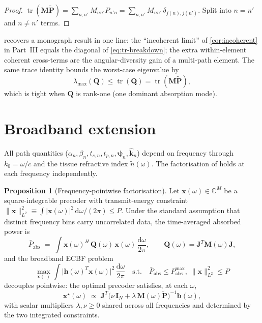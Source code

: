 \documentclass[11pt,a4paper]{article}
\theoremstyle{definition}
\newtheorem{proposition}[proposition]{Proposition}
\newcommand{\khat}{\hat{\bm{k}}}
\newcommand{\diff}{\mathrm{d}}
\newcommand{\Complex}{\mathbb{C}}
\newcommand{\Jmat}{\mathbf{J}}                 %
\newcommand{\Mmat}{\mathbf{M}}                 %
\newcommand{\Qmat}{\mathbf{Q}}                 %
\newcommand{\Pmat}{\tilde{\mathbf{P}}}         %
\newcommand{\xx}{\mathbf{x}}
\newcommand{\hh}{\mathbf{h}}
\newcommand{\bvec}{\mathbf{b}}
\newcommand{\psin}{\bm{\psi}_n}
\newcommand{\Id}{\mathbf{I}}
\begin{document}
\begin{proof}
$\operatorname{tr}(\Mmat\Pmat)=\sum_{n,n'}M_{nn'}P_{n'n}
=\sum_{n,n'}M_{nn'}\,\delta_{j(n),j(n')}$.  Split into $n=n'$ and $n\ne n'$
terms.
\end{proof}

 recovers a monograph result in one line: the
``incoherent limit'' of \cref{cor:incoherent} in Part~III equals the
diagonal of \eqref{eq:tr-breakdown}; the extra within-element coherent
cross-terms are the angular-diversity gain of a multi-path element.  The
same trace identity bounds the worst-case eigenvalue by
\begin{equation}\label{eq:lam-tr-bound}
  \lambda_{\max}(\Qmat)\le\operatorname{tr}(\Qmat)=\operatorname{tr}(\Mmat\Pmat),
\end{equation}
which is tight when $\Qmat$ is rank-one (one dominant absorption mode).

\section{Broadband extension}\label{sec:broadband}

All path quantities ($\alpha_n,\beta_n,t_{s,n},t_{p,n},\psin,\khat_n$) depend
on frequency through $k_0=\omega/c$ and the tissue refractive index
$\tilde{n}(\omega)$.  The factorisation of
 holds at each frequency independently.

\begin{proposition}[Frequency-pointwise factorisation]\label{prop:omega-pt}
Let $\xx(\omega)\in\Complex^M$ be a square-integrable precoder with
transmit-energy constraint
$\|\xx\|_{L^2}^2\equiv\int|\xx(\omega)|^2\,\diff\omega/(2\pi)\le P$.  Under
the standard assumption that distinct frequency bins carry uncorrelated
data, the time-averaged absorbed power is
\begin{equation}\label{eq:Pabs-omega}
  \bar{P}_\mathrm{abs}
  \;=\;\int \xx(\omega)^H\,\Qmat(\omega)\,\xx(\omega)\,\frac{\diff\omega}{2\pi},
  \qquad
  \Qmat(\omega)=\Jmat^T\Mmat(\omega)\Jmat,
\end{equation}
and the broadband ECBF problem
\begin{equation}\label{eq:ecbf-omega}
  \max_{\xx(\cdot)}\int\bigl|\hh(\omega)^T\xx(\omega)\bigr|^2\,\frac{\diff\omega}{2\pi}
  \quad\text{s.t.}\quad
  \bar{P}_\mathrm{abs}\le P_\mathrm{abs}^{\max},\;\|\xx\|_{L^2}^2\le P
\end{equation}
decouples pointwise: the optimal precoder satisfies, at each $\omega$,
\begin{equation}\label{eq:x-omega}
  \xx^\star(\omega)\;\propto\;\Jmat^T\bigl(\nu\,\Id_N
  +\lambda\,\Mmat(\omega)\Pmat\bigr)^{-1}\bvec(\omega),
\end{equation}
with scalar multipliers $\lambda,\nu\ge 0$ shared across all frequencies and
determined by the two integrated constraints.
\end{proposition}
\end{document}
